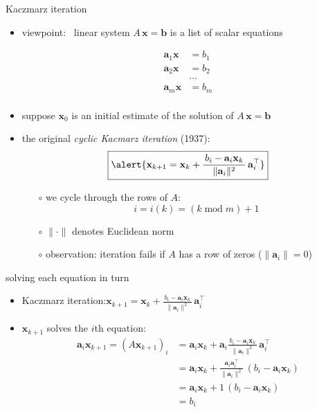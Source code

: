 \documentclass[usepdftitle=false,usenames,dvipsnames]{beamer}
\newcommand{\ba}{\mathbf{a}}
\newcommand{\bb}{\mathbf{b}}
\newcommand{\bx}{\mathbf{x}}
\newcommand{\ds}{\displaystyle}
\begin{document}
\begin{frame}{Kaczmarz iteration}

\begin{itemize}
\item viewpoint: \, linear system $A\,\bx=\bb$ is a list of scalar equations

\vspace{-6mm}
    \begin{align*}
    \ba_1 \bx &= b_1 \\
    \ba_2 \bx &= b_2 \\
              &\dots \\
    \ba_m \bx &= b_m \\
    \end{align*}

\vspace{-5mm}
\item suppose $\bx_0$ is an initial estimate of the solution of $A\,\bx=\bb$
\item the original \emph{cyclic Kacmarz iteration} (1937):
    $$\boxed{\alert{\bx_{k+1} = \bx_k + \frac{\,b_i - \ba_i \bx_k\,}{\|\ba_i\|^2}\, \ba_i^\top}}$$

    \begin{itemize}
    \item[$\circ$] we cycle through the rows of $A$:
        $$i = i(k) = (k \operatorname{mod} m) + 1$$
    \item[$\circ$] $\|\cdot\|$ denotes Euclidean norm
    \item[$\circ$] observation: iteration fails if $A$ has a row of zeros ($\|\ba_i\|=0$)
    \end{itemize}
\end{itemize}
\end{frame}


\begin{frame}{solving each equation in turn}

\begin{itemize}
\item Kaczmarz iteration:\quad $\ds \bx_{k+1} = \bx_k + \frac{\,b_i - \ba_i \bx_k\,}{\|\ba_i\|^2}\, \ba_i^\top$

\medskip
\item \alert{$\bx_{k+1}$ solves the $i$th equation}:
    \begin{align*}
    \ba_i \bx_{k+1} = (A \bx_{k+1})_i &= \ba_i\bx_k + \ba_i\frac{\,b_i - \ba_i \bx_k\,}{\|\ba_i\|^2}\, \ba_i^\top \\
                    &= \ba_i\bx_k + \frac{\ba_i\ba_i^\top}{\|\ba_i\|^2}\, (b_i - \ba_i \bx_k) \\
                    &= \ba_i\bx_k + 1\, (b_i - \ba_i \bx_k) \\
                    &= b_i
    \end{align*}
\end{itemize}
\end{frame}
\end{document}
